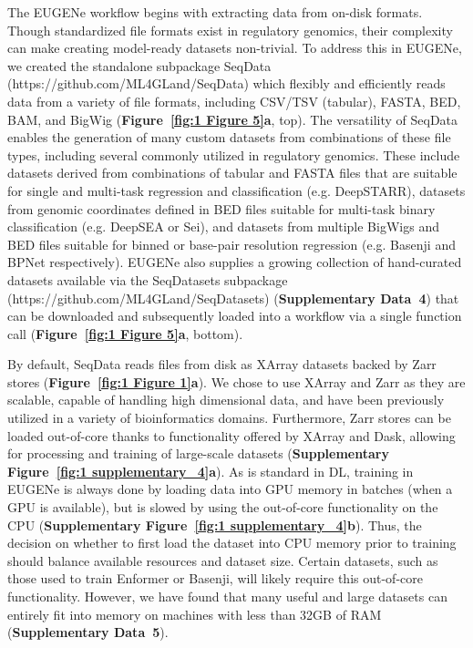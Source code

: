 The EUGENe workflow begins with extracting data from on-disk formats. Though standardized file formats exist in regulatory genomics, their complexity can make creating model-ready datasets non-trivial. To address this in EUGENe, we created the standalone subpackage SeqData (https://github.com/ML4GLand/SeqData) which flexibly and efficiently reads data from a variety of file formats, including CSV/TSV (tabular), FASTA, BED, BAM, and BigWig (\textbf{Figure~\ref{fig:1 Figure 5}\textbf{a}}, top). The versatility of SeqData enables the generation of many custom datasets from combinations of these file types, including several commonly utilized in regulatory genomics. These include datasets derived from combinations of tabular and FASTA files that are suitable for single and multi-task regression and classification (e.g. DeepSTARR\cite{De_Almeida2022-aa}), datasets from genomic coordinates defined in BED files suitable for multi-task binary classification (e.g. DeepSEA\cite{Zhou2015-rk} or Sei\cite{Chen2022-bn}), and datasets from multiple BigWigs and BED files suitable for binned or base-pair resolution regression (e.g. Basenji\cite{Kelley2018-if} and BPNet\cite{Avsec2021-sw} respectively). EUGENe also supplies a growing collection of hand-curated datasets available via the SeqDatasets subpackage (https://github.com/ML4GLand/SeqDatasets) (\textbf{Supplementary Data~4}) that can be downloaded and subsequently loaded into a workflow via a single function call (\textbf{Figure~\ref{fig:1 Figure 5}\textbf{a}}, bottom).

By default, SeqData reads files from disk as XArray datasets\cite{Hoyer2017-jv} backed by Zarr stores\cite{Miles2023-zk} (\textbf{Figure~\ref{fig:1 Figure 1}\textbf{a}}). We chose to use XArray and Zarr as they are scalable, capable of handling high dimensional data, and have been previously utilized in a variety of bioinformatics domains\cite{Baker2023-sp,Marconato2023-kz,Liu2021-km}. Furthermore, Zarr stores can be loaded out-of-core thanks to functionality offered by XArray and Dask\cite{Team2016-qa}, allowing for processing and training of large-scale datasets (\textbf{Supplementary Figure~\ref{fig:1 supplementary_4}\textbf{a}}). As is standard in DL, training in EUGENe is always done by loading data into GPU memory in batches (when a GPU is available), but is slowed by using the out-of-core functionality on the CPU (\textbf{Supplementary Figure~\ref{fig:1 supplementary_4}\textbf{b}}). Thus, the decision on whether to first load the dataset into CPU memory prior to training should balance available resources and dataset size. Certain datasets, such as those used to train Enformer\cite{Avsec2021-hh} or Basenji\cite{Kelley2018-if}, will likely require this out-of-core functionality. However, we have found that many useful and large datasets can entirely fit into memory on machines with less than 32GB of RAM (\textbf{Supplementary Data~5}).

